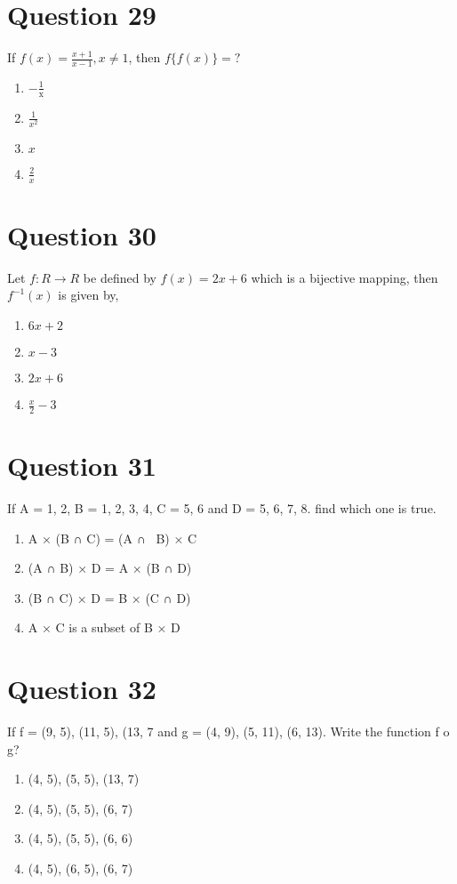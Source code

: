 \documentclass{article}
\begin{document}
\section*{Question 29}
If \(f(x)=\frac{x+1}{x-1}, x \neq 1\), then \(f\{f(x)\}=?\)
\begin{enumerate}[label=(\alph*)]
\item \(-\frac{1}{\mathrm{x}}\)
\item \(\frac{1}{x^{2}}\)
\item \(x\)
\item \(\frac{2}{x}\)
\end{enumerate}
\newpage
\section*{Question 30}
Let \({f}: {R} \rightarrow {R}\) be defined by \({f}({x})=2 {x}+6\) which is a bijective mapping, then \({f}^{-1}({x})\) is given by,\newline
\begin{enumerate}[label=(\alph*)]
\item \(6 x+2\)
\item \(x-3\)
\item \(2 x+6\)
\item \(\frac{x}{2}-3\)
\end{enumerate}
\newpage
\section*{Question 31}
If A = {1, 2}, B = {1, 2, 3, 4}, C = {5, 6} and D = {5, 6, 7, 8}. find which one is true.\newline
\begin{enumerate}[label=(\alph*)]
\item A × (B ∩ C) = (A ∩  B) × C
\item (A ∩ B) × D = A × (B ∩ D)
\item (B ∩ C) × D = B × (C ∩ D)
\item A × C is a subset of B × D
\end{enumerate}
\newpage
\section*{Question 32}
If f = {(9, 5), (11, 5), (13, 7} and g = {(4, 9), (5, 11), (6, 13)}. Write the function f o g?\newline
\begin{enumerate}[label=(\alph*)]
\item {(4, 5), (5, 5), (13, 7)}
\item {(4, 5), (5, 5), (6, 7)}
\item {(4, 5), (5, 5), (6, 6)}\newline
\item {(4, 5), (6, 5), (6, 7)}
\end{enumerate}
\newpage
\end{document}
